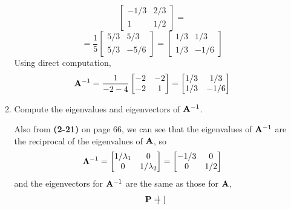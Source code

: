 \begin{enumerate}[font=\bfseries]
\begin{enumerate}
\[                \begin{bmatrix}
                    -1/3 & 2/3 \\
                    1 & 1/2
                \end{bmatrix}
                =
            \]
            \[
                =
                \frac{1}{5}
                \begin{bmatrix}
                    5/3 & 5/3 \\
                    5/3 & -5/6
                \end{bmatrix}
                =
                \begin{bmatrix}
                    1/3 & 1/3 \\
                    1/3 & -1/6
                \end{bmatrix}
            \]
            Using direct computation,
            \[
                \bold{A}^{-1}
                =
                \frac{1}{-2-4}
                \begin{bmatrix}
                    -2 & -2 \\
                    -2 & 1
                \end{bmatrix}
                =
                \begin{bmatrix}
                    1/3 & 1/3 \\
                    1/3 & -1/6
                \end{bmatrix}
            \]
            \item Compute the eigenvalues and eigenvectors of $\bold{A}^{-1}$.
            \par
            Also from \textbf{(2-21)} on page 66, we can see that the eigenvalues of $\bold{A}^{-1}$ are the reciprocal of the eigenvalues of $\bold{A}$, so
            \[
                \bold{\Lambda}^{-1}
                =
                \begin{bmatrix}
                    1/\lambda_1 & 0 \\
                    0 & 1/\lambda_2
                \end{bmatrix}
                =
                \begin{bmatrix}
                    -1/3 & 0 \\
                    0 & 1/2
                \end{bmatrix}
            \]
            and the eigenvectors for $\bold{A}^{-1}$ are the same as those for $\bold{A}$,
            \[
                \bold{P}
                =
                \begin{bmatrix}

\end{bmatrix}\]
\end{enumerate}
\end{enumerate}
